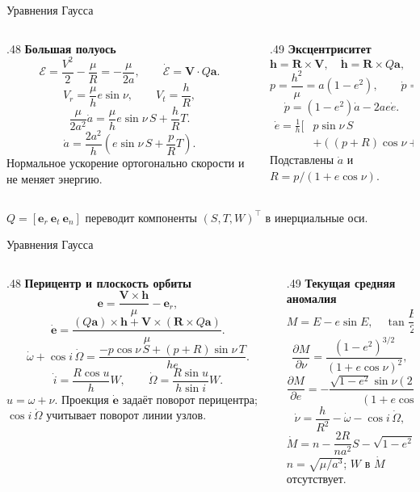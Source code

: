 \documentclass[11pt,aspectratio=169,t]{beamer}
\newcommand{\eqcompact}{\fontsize{10}{12}\selectfont}
\newcommand{\derivationmathspacing}{%
  \setlength{\abovedisplayskip}{2pt}%
  \setlength{\belowdisplayskip}{3pt}%
  \setlength{\abovedisplayshortskip}{2pt}%
  \setlength{\belowdisplayshortskip}{2pt}%
  \setlength{\jot}{2pt}}
\newcommand{\vect}[1]{\boldsymbol{#1}}
\begin{document}
\begin{frame}{Уравнения Гаусса}
\relax
\derivationmathspacing
\begin{columns}[T,onlytextwidth]
\begin{column}{.48\textwidth}
\textbf{Большая полуось}
{\eqcompact\derivationmathspacing
\[
 \mathcal E=\frac{V^2}{2}-\frac\mu R=-\frac\mu{2a},
 \qquad \dot{\mathcal E}=\vect V\cdot Q\vect a.
\]
\[
 V_r=\frac\mu h e\sin\nu,\qquad V_t=\frac hR,
\]
\[
 \frac\mu{2a^2}\dot a
 =\frac\mu h e\sin\nu\,S+\frac hR T.
\]
\[
 \boxed{\dot a=\frac{2a^2}{h}
       \left(e\sin\nu\,S+\frac pR T\right).}
\]
}
Нормальное ускорение ортогонально скорости и не меняет энергию.
\end{column}
\begin{column}{.49\textwidth}
\textbf{Эксцентриситет}
{\eqcompact\derivationmathspacing
\[
 \vect h=\vect R\times\vect V,\quad
 \dot{\vect h}=\vect R\times Q\vect a,\quad \dot h=RT.
\]
\[
 p=\frac{h^2}\mu=a(1-e^2),\qquad
 \dot p=\frac{2hR}\mu T,
\]
\[
 \dot p=(1-e^2)\dot a-2ae\dot e.
\]
\[
 \boxed{\begin{aligned}
 \dot e=\frac1h\bigl[&p\sin\nu\,S\\[-2pt]
 &+((p+R)\cos\nu+Re)T\bigr].
 \end{aligned}}
\]
}
Подставлены $\dot a$ и $R=p/(1+e\cos\nu)$.
\end{column}
\end{columns}
\smallskip
$Q=[\vect e_r\ \vect e_t\ \vect e_n]$ переводит компоненты $(S,T,W)^\top$ в инерциальные оси.
\end{frame}

\begin{frame}{Уравнения Гаусса}
\relax
\derivationmathspacing
\begin{columns}[T,onlytextwidth]
\begin{column}{.48\textwidth}
\textbf{Перицентр и плоскость орбиты}
{\eqcompact\derivationmathspacing
\[
 \vect e=\frac{\vect V\times\vect h}{\mu}-\vect e_r,
\]
\[
 \dot{\vect e}=\frac{(Q\vect a)\times\vect h
       +\vect V\times(\vect R\times Q\vect a)}\mu.
\]
\[
 \dot\omega+\cos i\,\dot\Omega
 =\frac{-p\cos\nu\,S+(p+R)\sin\nu\,T}{he}.
\]
\[
 \dot i=\frac{R\cos u}{h}W,\qquad
 \dot\Omega=\frac{R\sin u}{h\sin i}W.
\]
}
$u=\omega+\nu$. Проекция $\dot{\vect e}$ задаёт поворот перицентра; $\cos i\,\dot\Omega$ учитывает поворот линии узлов.
\end{column}
\begin{column}{.49\textwidth}
\textbf{Текущая средняя аномалия}
{\eqcompact\derivationmathspacing
\[
 M=E-e\sin E,\quad
 \tan\frac E2=\sqrt{\frac{1-e}{1+e}}\tan\frac\nu2,
\]
\[
 \frac{\partial M}{\partial\nu}
  =\frac{(1-e^2)^{3/2}}{(1+e\cos\nu)^2},
\]
\[
 \frac{\partial M}{\partial e}
  =-\frac{\sqrt{1-e^2}\sin\nu(2+e\cos\nu)}{(1+e\cos\nu)^2},
\]
\[
 \dot\nu=\frac h{R^2}-\dot\omega-\cos i\,\dot\Omega,
\]
\[
 \dot M=n-\frac{2R}{na^2}S
 -\sqrt{1-e^2}(\dot\omega+\cos i\,\dot\Omega).
\]
}
$n=\sqrt{\mu/a^3}$; $W$ в $\dot M$ отсутствует.
\end{column}
\end{columns}
\end{frame}
\end{document}
